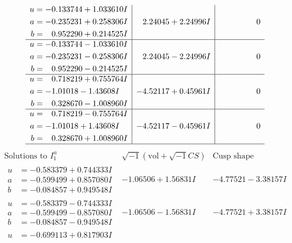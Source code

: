 \documentclass[1p]{elsarticle_modified}
\theoremstyle{definition}
\newcommand{\I}{\sqrt{-1}}
\begin{document}
$$\begin{array}{c|c|c}
\begin{aligned}
u &= -0.133744 + 1.033610 I \\
a &= -0.235231 + 0.258306 I \\
b &= \phantom{-}0.952290 + 0.214525 I\end{aligned}
 & \phantom{-}2.24045 + 2.24996 I & \phantom{-0.000000 } 0 \\ \hline\begin{aligned}
u &= -0.133744 - 1.033610 I \\
a &= -0.235231 - 0.258306 I \\
b &= \phantom{-}0.952290 - 0.214525 I\end{aligned}
 & \phantom{-}2.24045 - 2.24996 I & \phantom{-0.000000 } 0 \\ \hline\begin{aligned}
u &= \phantom{-}0.718219 + 0.755764 I \\
a &= -1.01018 - 1.43608 I \\
b &= \phantom{-}0.328670 - 1.008960 I\end{aligned}
 & -4.52117 + 0.45961 I & \phantom{-0.000000 } 0 \\ \hline\begin{aligned}
u &= \phantom{-}0.718219 - 0.755764 I \\
a &= -1.01018 + 1.43608 I \\
b &= \phantom{-}0.328670 + 1.008960 I\end{aligned}
 & -4.52117 - 0.45961 I & \phantom{-0.000000 } 0\\
 \hline 
 \end{array}$$\newpage$$\begin{array}{c|c|c}  
\text{Solutions to }I^u_{1}& \I (\text{vol} + \sqrt{-1}CS) & \text{Cusp shape}\\
 \hline 
\begin{aligned}
u &= -0.583379 + 0.744333 I \\
a &= -0.599499 + 0.857080 I \\
b &= -0.084857 + 0.949548 I\end{aligned}
 & -1.06506 + 1.56831 I & -4.77521 - 3.38157 I \\ \hline\begin{aligned}
u &= -0.583379 - 0.744333 I \\
a &= -0.599499 - 0.857080 I \\
b &= -0.084857 - 0.949548 I\end{aligned}
 & -1.06506 - 1.56831 I & -4.77521 + 3.38157 I \\ \hline\begin{aligned}
u &= -0.699113 + 0.817903 I \\

\end{aligned}
\end{array}$$
\end{document}
